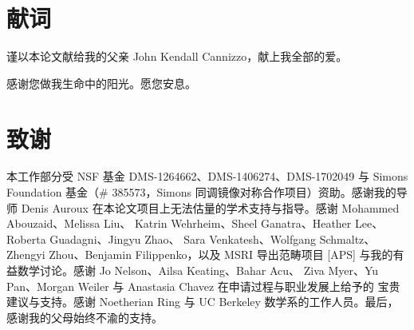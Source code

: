 
\section*{献词}

\begin{center}
谨以本论文献给我的父亲 John Kendall Cannizzo，献上我全部的爱。

感谢您做我生命中的阳光。愿您安息。
\end{center}


\section*{致谢}

本工作部分受 NSF 基金 DMS-1264662、DMS-1406274、DMS-1702049 与 Simons Foundation
基金（\# 385573，Simons 同调镜像对称合作项目）资助。感谢我的导师 Denis Auroux
在本论文项目上无法估量的学术支持与指导。感谢 Mohammed Abouzaid、Melissa Liu、
Katrin Wehrheim、Sheel Ganatra、Heather Lee、Roberta Guadagni、Jingyu Zhao、
Sara Venkatesh、Wolfgang Schmaltz、Zhengyi Zhou、Benjamin Filippenko，以及 MSRI
导出范畴项目 [APS] 与我的有益数学讨论。感谢 Jo Nelson、Ailsa Keating、Bahar Acu、
Ziva Myer、Yu Pan、Morgan Weiler 与 Anastasia Chavez 在申请过程与职业发展上给予的
宝贵建议与支持。感谢 Noetherian Ring 与 UC Berkeley 数学系的工作人员。最后，
感谢我的父母始终不渝的支持。



